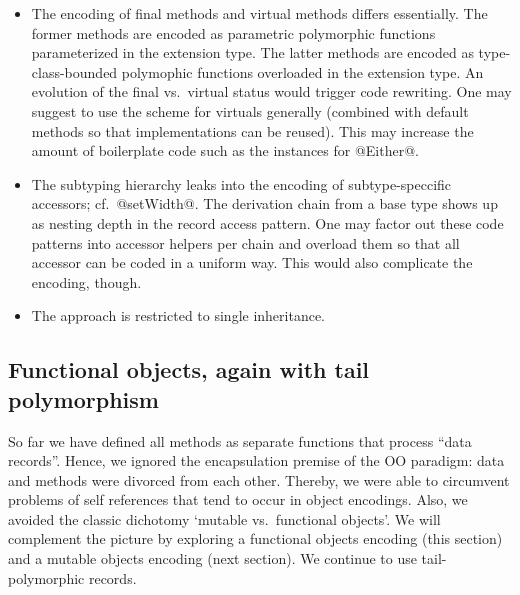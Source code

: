 \documentclass{jfp}
\begin{document}
\begin{itemize}
\smallskip

\item
The encoding of final methods and virtual methods differs essentially.
The former methods are encoded as parametric polymorphic functions
parameterized in the extension type. The latter methods are encoded as
type-class-bounded polymophic functions overloaded in the extension
type. An evolution of the final vs.\ virtual status would trigger code
rewriting.  One may suggest to use the scheme for virtuals generally
(combined with default methods so that implementations can be
reused). This may increase the amount of boilerplate code such as the
instances for @Either@.

\smallskip

\item
The subtyping hierarchy leaks into the encoding of subtype-speccific
accessors; cf.\ @setWidth@. The derivation chain from a base type
shows up as nesting depth in the record access pattern. One may factor
out these code patterns into accessor helpers per chain and overload
them so that all accessor can be coded in a uniform way. This would
also complicate the encoding, though.

\smallskip

\item
The approach is restricted to single inheritance.

\end{itemize}




\newpage

\subsection{Functional objects, again with tail polymorphism}
\label{S:funcobj}

So far we have defined all methods as separate functions that process
``data records''. Hence, we ignored the encapsulation premise of the
OO paradigm: data and methods were divorced from each other. Thereby,
we were able to circumvent problems of self references that tend to
occur in object encodings. Also, we avoided the classic dichotomy
`mutable vs.\ functional objects'. We will complement the picture by
exploring a functional objects encoding (this section) and a mutable
objects encoding (next section). We continue to use tail-polymorphic
records.
\end{document}
